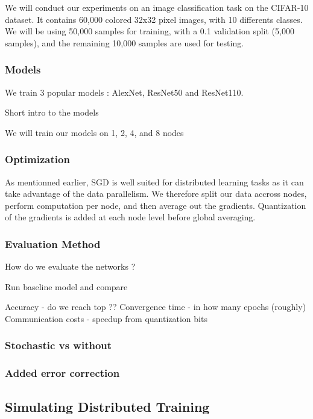 \documentclass[10pt,conference,compsocconf]{IEEEtran}
\begin{document}
We will conduct our experiments on an image classification task on the CIFAR-10 dataset. It contains 60,000 colored 32x32 pixel images, with 10 differents classes. We will be using 50,000 samples for training, with a 0.1 validation split (5,000 samples), and the remaining 10,000 samples are used for testing.

\subsubsection{Models}

We train 3 popular models : AlexNet, ResNet50 and ResNet110.

Short intro to the models

We will train our models on 1, 2, 4, and 8 nodes

\subsubsection{Optimization}

As mentionned earlier, SGD is well suited for distributed learning tasks as it can take advantage of the data parallelism. We therefore split our data accross nodes, perform computation per node, and then average out the gradients. Quantization of the gradients is added at each node level before global averaging.

\subsubsection{Evaluation Method}
How do we evaluate the networks ?

Run baseline model and compare

Accuracy - do we reach top ??
Convergence time - in how many epochs (roughly)
Communication costs - speedup from quantization bits


\subsubsection{ Stochastic vs without}
\subsubsection{ Added error correction}

\subsection{Simulating Distributed Training}
\end{document}
